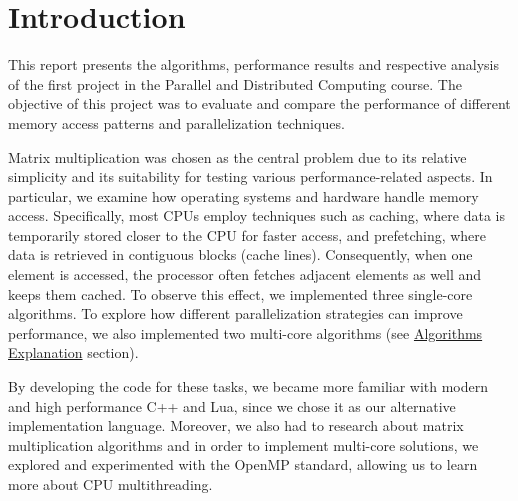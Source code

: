 \section{Introduction} \label{section:introduction}

This report presents the algorithms, performance results and respective analysis of the first project in the Parallel and Distributed Computing course. The objective of this project was to evaluate and compare the performance of different memory access patterns and parallelization techniques. 

Matrix multiplication was chosen as the central problem due to its relative simplicity and its suitability for testing various performance-related aspects. In particular, we examine how operating systems and hardware handle memory access. Specifically, most CPUs employ techniques such as caching, where data is temporarily stored closer to the CPU for faster access, and prefetching, where data is retrieved in contiguous blocks (cache lines). Consequently, when one element is accessed, the processor often fetches adjacent elements as well and keeps them cached. To observe this effect, we implemented three single-core algorithms. To explore how different parallelization strategies can improve performance, we also implemented two multi-core algorithms (see \hyperref[section:algorithms]{Algorithms Explanation} section). 

By developing the code for these tasks, we became more familiar with modern and high performance C++ and Lua, since we chose it as our alternative implementation language. Moreover, we also had to research about matrix multiplication algorithms and in order to implement multi-core solutions, we explored and experimented with the OpenMP standard, allowing us to learn more about CPU multithreading. 
